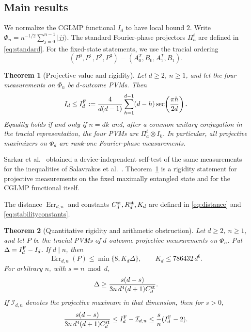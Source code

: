 \documentclass[11pt]{amsart}
\newtheorem{theorem}{Theorem}[section]
\theoremstyle{remark}
\theoremstyle{plain}
\numberwithin{equation}{section}
\DeclareMathOperator{\Err}{Err}
\newcommand{\ket}[1]{\lvert#1\rangle}
\newcommand{\IF}{I_d^{\rm F}}
\begin{document}
\subsection*{Main results}

We normalize the CGLMP functional \(I_d\) to have local bound \(2\).
Write \(\Phi_n=n^{-1/2}\sum_{j=0}^{n-1}\ket{jj}\).
The standard Fourier-phase projectors \(\Pi^t_a\) are defined in
\eqref{eq:standard}. For the fixed-state statements, we use the tracial
ordering
\[
 (P^0,P^1,P^2,P^3)=(A_0^T,B_0,A_1^T,B_1).
\]

\begin{theorem}[Projective value and rigidity]\label{thm:value}
Let \(d\ge2\), \(n\ge1\), and let the four measurements on \(\Phi_n\)
be \(d\)-outcome PVMs. Then
\begin{equation}\label{eq:sharpvalue}
 I_d\le\IF:=
 \frac4{d(d-1)}\sum_{h=1}^{d-1}(d-h)
                  \sec\!\left(\frac{\pi h}{2d}\right).
\end{equation}
Equality holds if and only if \(n=dk\) and, after a common unitary
conjugation in the tracial representation, the four PVMs are
\(\Pi^t_a\otimes I_k\). In particular, all projective maximizers on
\(\Phi_d\) are rank-one Fourier-phase measurements.
\end{theorem}

Sarkar et al.\ \cite{Sarkar} obtained a device-independent self-test
of the same measurements for the inequalities of Salavrakos
et al.\ \cite{SATWAP}. Theorem~\ref{thm:value} is a rigidity statement
for projective measurements on the fixed maximally entangled state
and for the CGLMP functional itself.

The distance \(\Err_{d,n}\) and constants \(C_d^{\rm st},R_d^{\rm st},K_d\)
are defined in \eqref{eq:distance} and \eqref{eq:stabilityconstants}.

\begin{theorem}[Quantitative rigidity and arithmetic obstruction]
\label{thm:robust}
Let \(d\ge2\), \(n\ge1\), and let \(P\) be the tracial PVMs of
\(d\)-outcome projective measurements on \(\Phi_n\).
Put \(\Delta=\IF-I_d\). If \(d\mid n\), then
\begin{equation}\label{eq:robust}
 \Err_{d,n}(P)\le\min\{8,K_d\Delta\},
 \qquad K_d\le786432\,d^6.
\end{equation}
For arbitrary \(n\), with \(s=n\bmod d\),
\begin{equation}\label{eq:arithmeticgap}
 \Delta\ge
 \frac{s(d-s)}{3n\,d^4(d+1)C_d^{\rm st}}.
\end{equation}
If \(\mathcal I_{d,n}\) denotes the projective maximum in that
dimension, then for \(s>0\),
\begin{equation}\label{eq:gaporder}
 \frac{s(d-s)}{3n\,d^4(d+1)C_d^{\rm st}}
 \le\IF-\mathcal I_{d,n}
 \le\frac{s}{n}(\IF-2).
\end{equation}
\end{theorem}
\end{document}
